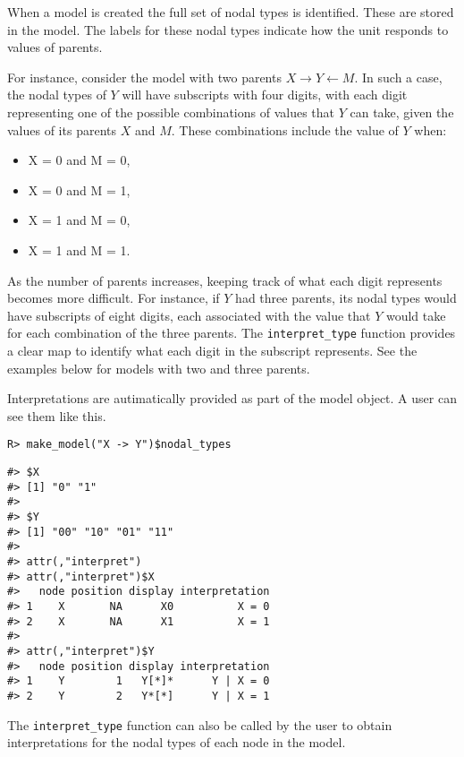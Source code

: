 \documentclass[
  11pt,
  article]{jss}
\providecommand{\tightlist}{%
  \setlength{\itemsep}{0pt}\setlength{\parskip}{0pt}}\usepackage{longtable,booktabs,array}
\begin{document}
When a model is created the full set of nodal types is identified. These
are stored in the model. The labels for these nodal types indicate how
the unit responds to values of parents.

For instance, consider the model with two parents
\(X \rightarrow Y \leftarrow M.\) In such a case, the nodal types of
\(Y\) will have subscripts with four digits, with each digit
representing one of the possible combinations of values that \(Y\) can
take, given the values of its parents \(X\) and \(M.\) These
combinations include the value of \(Y\) when:

\begin{itemize}
\tightlist
\item
  X = 0 and M = 0,
\item
  X = 0 and M = 1,
\item
  X = 1 and M = 0,
\item
  X = 1 and M = 1.
\end{itemize}

As the number of parents increases, keeping track of what each digit
represents becomes more difficult. For instance, if \(Y\) had three
parents, its nodal types would have subscripts of eight digits, each
associated with the value that \(Y\) would take for each combination of
the three parents. The \texttt{interpret\_type} function provides a
clear map to identify what each digit in the subscript represents. See
the examples below for models with two and three parents.

Interpretations are autimatically provided as part of the model object.
A user can see them like this.

\begin{verbatim}
R> make_model("X -> Y")$nodal_types
\end{verbatim}

\begin{verbatim}
#> $X
#> [1] "0" "1"
#> 
#> $Y
#> [1] "00" "10" "01" "11"
#> 
#> attr(,"interpret")
#> attr(,"interpret")$X
#>   node position display interpretation
#> 1    X       NA      X0          X = 0
#> 2    X       NA      X1          X = 1
#> 
#> attr(,"interpret")$Y
#>   node position display interpretation
#> 1    Y        1   Y[*]*      Y | X = 0
#> 2    Y        2   Y*[*]      Y | X = 1
\end{verbatim}

The \texttt{interpret\_type} function can also be called by the user to
obtain interpretations for the nodal types of each node in the model.
\end{document}
